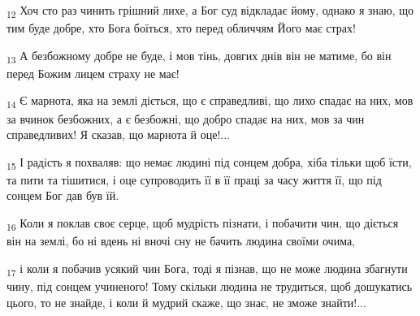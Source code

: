 \begin{tcolorbox}
\textsubscript{12} Хоч сто раз чинить грішний лихе, а Бог суд відкладає йому, однако я знаю, що тим буде добре, хто Бога боїться, хто перед обличчям Його має страх!
\end{tcolorbox}
\begin{tcolorbox}
\textsubscript{13} А безбожному добре не буде, і мов тінь, довгих днів він не матиме, бо він перед Божим лицем страху не має!
\end{tcolorbox}
\begin{tcolorbox}
\textsubscript{14} Є марнота, яка на землі діється, що є справедливі, що лихо спадає на них, мов за вчинок безбожних, а є безбожні, що добро спадає на них, мов за чин справедливих! Я сказав, що марнота й оце!...
\end{tcolorbox}
\begin{tcolorbox}
\textsubscript{15} І радість я похваляв: що немає людині під сонцем добра, хіба тільки щоб їсти, та пити та тішитися, і оце супроводить її в її праці за часу життя її, що під сонцем Бог дав був їй.
\end{tcolorbox}
\begin{tcolorbox}
\textsubscript{16} Коли я поклав своє серце, щоб мудрість пізнати, і побачити чин, що діється він на землі, бо ні вдень ні вночі сну не бачить людина своїми очима,
\end{tcolorbox}
\begin{tcolorbox}
\textsubscript{17} і коли я побачив усякий чин Бога, тоді я пізнав, що не може людина збагнути чину, під сонцем учиненого! Тому скільки людина не трудиться, щоб дошукатись цього, то не знайде, і коли й мудрий скаже, що знає, не зможе знайти!...
\end{tcolorbox}

